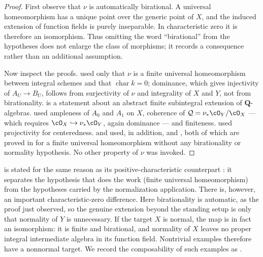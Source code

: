 \begin{proof}
First observe that $\nu$ is automatically birational.  A universal
homeomorphism has a unique point over the generic point of $X$, and the
induced extension of function fields is purely inseparable.  In
characteristic zero it is therefore an isomorphism.  Thus omitting the word
``birational'' from the hypotheses does not enlarge the class of morphisms;
it records a consequence rather than an additional assumption.

Now inspect the proofs.   used only that
$\nu$ is a finite universal homeomorphism between integral schemes and
that $\operatorname{char}k=0$; dominance, which gives injectivity of
$A_U\to B_U$, follows from surjectivity of $\nu$ and integrality of
$X$ and $Y$, not from birationality.
 is a statement about an abstract
finite subintegral extension of $\mathbf Q$-algebras.
 used ampleness of $A_0$ and $A_1$ on
$X$, coherence of $\mathcal Q=\nu_*\cO_Y/\cO_X$ --- which requires
$\cO_X\hookrightarrow\nu_*\cO_Y$, again dominance --- and finiteness.
 used projectivity for centeredness.
 and
 used, in addition,
 and
, both of which are proved in
 for a finite universal homeomorphism
without any birationality or normality hypothesis.  No other property of
$\nu$ was invoked.
\end{proof}

\begin{remark}
\label{rem:ch44-generality-not-exploited}
 is stated for the same reason as its
positive-characteristic counterpart
: it separates the hypothesis that
does the work (finite universal homeomorphism) from the hypotheses carried
by the normalization application.  There is, however, an important
characteristic-zero difference.  Here birationality is automatic, as the
proof just observed, so the genuine extension beyond the standing setup is
only that normality of $Y$ is unnecessary.  If the target $X$ is normal,
the map is in fact an isomorphism: it is finite and birational, and normality
of $X$ leaves no proper integral intermediate algebra in its function
field.  Nontrivial examples therefore have a nonnormal target.  We record
the composability of such examples as
.
\end{remark}

